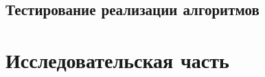 \documentclass{bmstu}
\begin{document}
\section{Тестирование реализации алгоритмов}




\chapter{Исследовательская часть}
\end{document}
